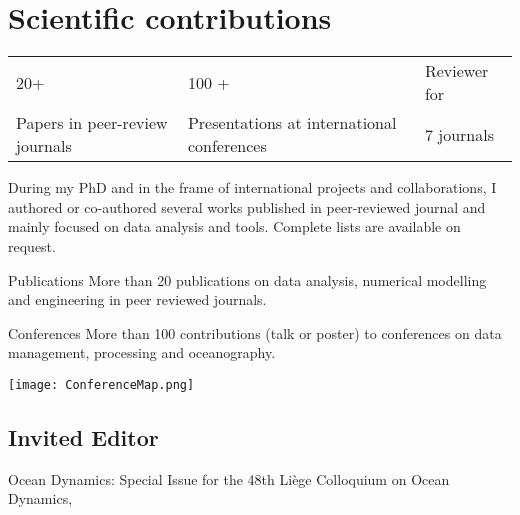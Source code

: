 \documentclass[11pt,a4paper,svgnames]{article}
\begin{document}
\section{Scientific contributions}

\begin{table}
\centering
\begin{tabular}{C{4cm}C{4cm}C{4cm}}
\huge{20+}  	& \huge{100 +} & 	Reviewer for\hspace{1cm}  \\
Papers in peer-review journals & Presentations at international conferences	& \huge{7} \hspace{2cm} \normalsize{journals} \\
\end{tabular}
\end{table}

\begin{summarybox}
During my PhD and in the frame of international projects and collaborations, I authored or co-authored several works published in peer-reviewed journal and mainly focused on data analysis and tools. Complete lists are available on request.
\end{summarybox}

Publications More than 20 publications on data analysis, numerical modelling and engineering in peer reviewed journals.

Conferences More than 100 contributions (talk or poster) to conferences on data management, processing and oceanography.




 

\begin{center}
\texttt{[image: ConferenceMap.png]}
\end{center}

\subsection{Invited Editor}

Ocean Dynamics: Special Issue for the 48th Li\`{e}ge Colloquium on Ocean Dynamics, 
\end{document}
